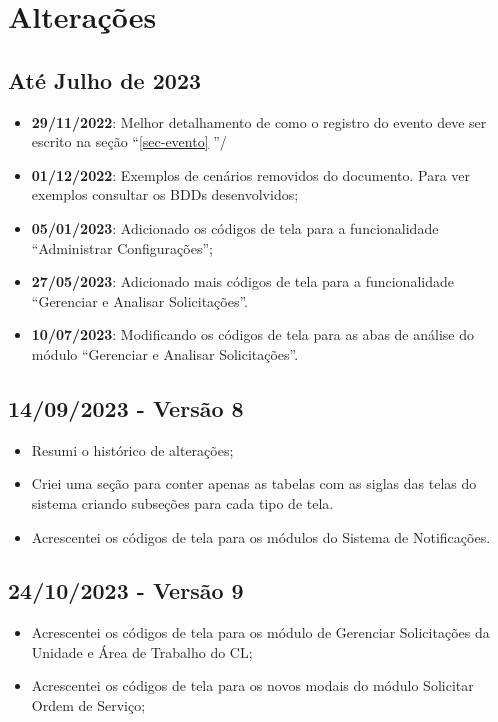 
\chapter*{Alterações}

\section*{Até Julho de 2023}


\begin{itemize}
	\item \textbf{29/11/2022}: Melhor detalhamento de como o registro do evento deve ser escrito na seção ``\ref{sec-evento} ''/
	\item \textbf{01/12/2022}: Exemplos de cenários removidos do documento.
	Para ver exemplos consultar os BDDs desenvolvidos;
	\item \textbf{05/01/2023}: Adicionado os códigos de tela para a funcionalidade ``Administrar Configurações'';
	\item \textbf{27/05/2023}: Adicionado mais códigos de tela para a funcionalidade ``Gerenciar e Analisar Solicitações''.
	\item \textbf{10/07/2023}: Modificando os códigos de tela para as abas de análise do módulo ``Gerenciar e Analisar Solicitações''.
\end{itemize}

\section*{14/09/2023 - Versão 8}
	\begin{itemize}
		\item Resumi o histórico de alterações;
		\item Criei uma seção para conter apenas as tabelas com as siglas das telas do sistema criando subseções para cada tipo de tela.
		\item Acrescentei os códigos de tela para os módulos do Sistema de Notificações.
	\end{itemize}

\section*{24/10/2023 - Versão 9}
\begin{itemize}
	\item Acrescentei os códigos de tela para os módulo de Gerenciar Solicitações da Unidade e Área de Trabalho do CL;
	\item Acrescentei os códigos de tela para os novos modais do módulo Solicitar Ordem de Serviço;
\end{itemize}


